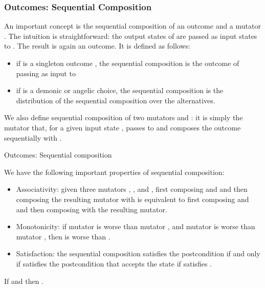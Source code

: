 \documentclass{CSML}
\theoremstyle{definition}\newtheorem{notation}[thm]{Notation}
\theoremstyle{plain}\newtheorem{satz}[thm]{Satz}
\begin{document}
\subsubsection{Outcomes: Sequential Composition}

An important concept is the sequential composition  of 
an outcome  and a mutator . \label{mutator-seqcomp} The 
intuition is straightforward: the output states of  are 
passed as input states to . The result is again an outcome. 
It is defined as follows: 
\begin{itemize}
\item if  is a singleton outcome , 
    the sequential composition is the outcome of passing 
     as input to 
\item if  is a demonic or angelic choice, the 
    sequential composition is the distribution of the 
    sequential composition over the alternatives.
\end{itemize} 

We also define sequential composition  of two mutators 
 and : it is simply the mutator that, for a given input 
state , passes  to  and composes the outcome 
sequentially with . 

\begin{defi}{Outcomes: Sequential composition}



\end{defi}

We have the following important properties of sequential 
composition:
\begin{itemize}
\item Associativity: given three mutators , , and 
    , first composing  and  and then composing the 
    resulting mutator with  is equivalent to first 
    composing  and  and then composing  with the 
    resulting mutator.
\item Monotonicity: if mutator  is worse than mutator 
    , and mutator  is worse than mutator , 
    then  is worse than .
\item Satisfaction: the sequential composition  
    satisfies the postcondition  if and only if  
    satisfies the postcondition that accepts the state  
    if  satisfies .
\end{itemize}

\begin{lem}

\end{lem}

\begin{lem}
If  and  then .
\end{lem}
\end{document}
